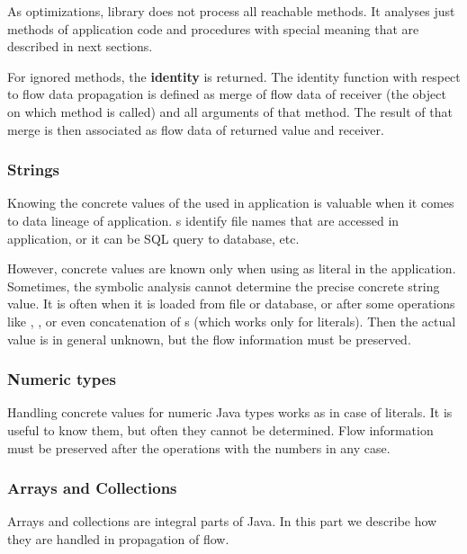 As optimizations, library does not process all reachable methods.
It analyses just methods of application code and procedures with special
meaning that are described in next sections.

For ignored methods, the \textbf{identity} is returned.
The identity function with respect to flow data propagation is defined as
merge of flow data of receiver (the object on which method is called) and
all arguments of that method. The result of that merge is then associated
as flow data of returned value and receiver.




\subsubsection{Strings}

Knowing the concrete values of the  used in application is valuable
when it comes to data lineage of application.
s identify file names that are accessed in application,
or it can be SQL query to database, etc.

However, concrete values are known only when using as literal in the application.
Sometimes, the symbolic analysis cannot determine the precise concrete string value.
It is often when it is loaded from file or database, or after some operations
like , , or even concatenation of s
(which works only for  literals).
Then the actual value is in general unknown, but the flow information must be preserved.




\subsubsection{Numeric types}

Handling concrete values for numeric Java types works as in case
of  literals. It is useful to know them, but often
they cannot be determined. Flow information must be preserved after
the operations with the numbers in any case.




\subsubsection{Arrays and Collections}

Arrays and collections are integral parts of Java. In this part we describe how
they are handled in propagation of flow.

